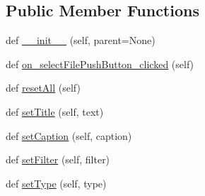 \subsection*{Public Member Functions}
\begin{DoxyCompactItemize}
\item 
def \mbox{\hyperlink{class_dsg_tools_1_1_custom_widgets_1_1select_file_widget_1_1_select_file_widget_ac97bd1adc1031292875c6092c2930141}{\+\_\+\+\_\+init\+\_\+\+\_\+}} (self, parent=None)
\item 
def \mbox{\hyperlink{class_dsg_tools_1_1_custom_widgets_1_1select_file_widget_1_1_select_file_widget_a1facefe600748b4619f1d1baf0648560}{on\+\_\+select\+File\+Push\+Button\+\_\+clicked}} (self)
\item 
def \mbox{\hyperlink{class_dsg_tools_1_1_custom_widgets_1_1select_file_widget_1_1_select_file_widget_a0ca22553389590ce5cf4c23e31120001}{reset\+All}} (self)
\item 
def \mbox{\hyperlink{class_dsg_tools_1_1_custom_widgets_1_1select_file_widget_1_1_select_file_widget_ad9f23953026d8aa91b1d55a7ef6701e2}{set\+Title}} (self, text)
\item 
def \mbox{\hyperlink{class_dsg_tools_1_1_custom_widgets_1_1select_file_widget_1_1_select_file_widget_a3ebbe1dd47552fec0eba2e548767b64a}{set\+Caption}} (self, caption)
\item 
def \mbox{\hyperlink{class_dsg_tools_1_1_custom_widgets_1_1select_file_widget_1_1_select_file_widget_ae94ba4db183b10da4b90fd7ed01a0c33}{set\+Filter}} (self, filter)
\item 
def \mbox{\hyperlink{class_dsg_tools_1_1_custom_widgets_1_1select_file_widget_1_1_select_file_widget_ae644626e3c62d1de3f35415042defe1f}{set\+Type}} (self, type)
\end{DoxyCompactItemize}
